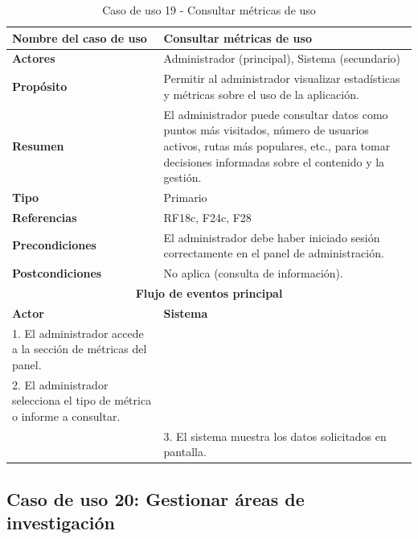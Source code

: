 \begin{table}[H]
\centering
\caption{Caso de uso 19 - Consultar métricas de uso}
\begin{tabular}{|p{4.5cm}|p{10.5cm}|}
\hline
\textbf{Nombre del caso de uso} & Consultar métricas de uso \\
\hline
\textbf{Actores} & Administrador (principal), Sistema (secundario) \\
\hline
\textbf{Propósito} & Permitir al administrador visualizar estadísticas y métricas sobre el uso de la aplicación. \\
\hline
\textbf{Resumen} & El administrador puede consultar datos como puntos más visitados, número de usuarios activos, rutas más populares, etc., para tomar decisiones informadas sobre el contenido y la gestión. \\
\hline
\textbf{Tipo} & Primario \\
\hline
\textbf{Referencias} & RF18c, F24c, F28 \\
\hline
\textbf{Precondiciones} & El administrador debe haber iniciado sesión correctamente en el panel de administración. \\
\hline
\textbf{Postcondiciones} & No aplica (consulta de información). \\
\hline
\multicolumn{2}{|c|}{\textbf{Flujo de eventos principal}} \\
\hline
\textbf{Actor} & \textbf{Sistema} \\
\hline
1. El administrador accede a la sección de métricas del panel. & \\
\hline
2. El administrador selecciona el tipo de métrica o informe a consultar. & \\
\hline
& 3. El sistema muestra los datos solicitados en pantalla. \\
\hline
\end{tabular}
\end{table}

\subsection{Caso de uso 20: Gestionar áreas de investigación}

